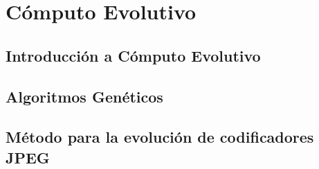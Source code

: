 
\chapter{Cómputo Evolutivo}\label{ch:evolucion}

\section{Introducción a Cómputo Evolutivo}

\section{Algoritmos Genéticos}

\section{Método para la evolución de codificadores JPEG}
